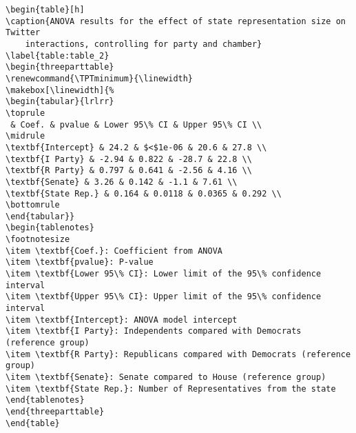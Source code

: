 \documentclass[11pt]{article}
\begin{document}
\begin{Verbatim}[tabsize=4]
\begin{table}[h]
\caption{ANOVA results for the effect of state representation size on Twitter
	interactions, controlling for party and chamber}
\label{table:table_2}
\begin{threeparttable}
\renewcommand{\TPTminimum}{\linewidth}
\makebox[\linewidth]{%
\begin{tabular}{lrlrr}
\toprule
 & Coef. & pvalue & Lower 95\% CI & Upper 95\% CI \\
\midrule
\textbf{Intercept} & 24.2 & $<$1e-06 & 20.6 & 27.8 \\
\textbf{I Party} & -2.94 & 0.822 & -28.7 & 22.8 \\
\textbf{R Party} & 0.797 & 0.641 & -2.56 & 4.16 \\
\textbf{Senate} & 3.26 & 0.142 & -1.1 & 7.61 \\
\textbf{State Rep.} & 0.164 & 0.0118 & 0.0365 & 0.292 \\
\bottomrule
\end{tabular}}
\begin{tablenotes}
\footnotesize
\item \textbf{Coef.}: Coefficient from ANOVA
\item \textbf{pvalue}: P-value
\item \textbf{Lower 95\% CI}: Lower limit of the 95\% confidence interval
\item \textbf{Upper 95\% CI}: Upper limit of the 95\% confidence interval
\item \textbf{Intercept}: ANOVA model intercept
\item \textbf{I Party}: Independents compared with Democrats (reference group)
\item \textbf{R Party}: Republicans compared with Democrats (reference group)
\item \textbf{Senate}: Senate compared to House (reference group)
\item \textbf{State Rep.}: Number of Representatives from the state
\end{tablenotes}
\end{threeparttable}
\end{table}

\end{Verbatim}
\end{document}
